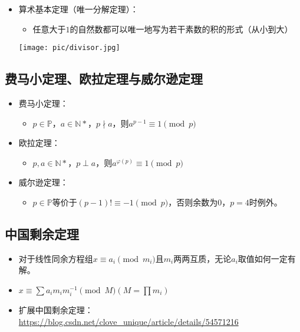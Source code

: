 \documentclass{beamer}
\begin{document}
\begin{frame}
\begin{itemize}[<+-| alert@+>]
	\item 算术基本定理（唯一分解定理）：
		\begin{itemize}[<+-| alert@+>]
			\item 任意大于$1$的自然数都可以唯一地写为若干素数的积的形式（从小到大）
		\end{itemize}
	\texttt{[image: pic/divisor.jpg]}
\end{itemize}
\end{frame}

\subsection{费马小定理、欧拉定理与威尔逊定理}

\begin{frame}
\begin{itemize}[<+-| alert@+>]
	\item 费马小定理：
		\begin{itemize}[<+-| alert@+>]
			\item $p \in \mathbb{P}$，$a \in \mathbb{N*}$，$p \nmid a$，则$a^{p-1} \equiv 1 \pmod p$
		\end{itemize}
	\item 欧拉定理：
		\begin{itemize}[<+-| alert@+>]
			\item $p,a \in \mathbb{N*}$，$p \perp a$，则$a^{\varphi(p)} \equiv 1 \pmod p$
		\end{itemize}
	\item 威尔逊定理：
		\begin{itemize}[<+-| alert@+>]
			\item $p \in \mathbb{P}$等价于$(p-1)! \equiv -1 \pmod p$，否则余数为$0$，$p=4$时例外。
		\end{itemize}
\end{itemize}
\end{frame}

\subsection{中国剩余定理}

\begin{frame}
\begin{itemize}[<+-| alert@+>]
	\item 对于线性同余方程组$x \equiv a_i \pmod {m_i}$且$m_i$两两互质，无论$a_i$取值如何一定有解。
	\item $x \equiv \sum a_{i}m_{i}m_{i}^{-1} \pmod M(M=\prod m_i)$
	\item 扩展中国剩余定理：\url{https://blog.csdn.net/clove_unique/article/details/54571216}
\end{itemize}
\end{frame}
\end{document}
